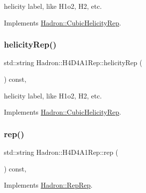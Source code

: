 helicity label, like H1o2, H2, etc. 

Implements \mbox{\hyperlink{structHadron_1_1CubicHelicityRep_af1096946b7470edf0a55451cc662f231}{Hadron\+::\+Cubic\+Helicity\+Rep}}.

\mbox{\label{structHadron_1_1H4D4A1Rep_a8ac76b2d5ec00ea18a04b62a2a5d20bb}} 
\subsubsection{\texorpdfstring{helicityRep()}{helicityRep()}\hspace{0.1cm}{\footnotesize\ttfamily [3/3]}}
{\footnotesize\ttfamily std\+::string Hadron\+::\+H4\+D4\+A1\+Rep\+::helicity\+Rep (\begin{DoxyParamCaption}{ }\end{DoxyParamCaption}) const\hspace{0.3cm}{\ttfamily [inline]}, {\ttfamily [virtual]}}

helicity label, like H1o2, H2, etc. 

Implements \mbox{\hyperlink{structHadron_1_1CubicHelicityRep_af1096946b7470edf0a55451cc662f231}{Hadron\+::\+Cubic\+Helicity\+Rep}}.

\mbox{\label{structHadron_1_1H4D4A1Rep_a5b67fac5b33edc0fa72a93420b2714ca}} 
\subsubsection{\texorpdfstring{rep()}{rep()}\hspace{0.1cm}{\footnotesize\ttfamily [1/5]}}
{\footnotesize\ttfamily std\+::string Hadron\+::\+H4\+D4\+A1\+Rep\+::rep (\begin{DoxyParamCaption}{ }\end{DoxyParamCaption}) const\hspace{0.3cm}{\ttfamily [inline]}, {\ttfamily [virtual]}}



Implements \mbox{\hyperlink{structHadron_1_1RepRep_ab3213025f6de249f7095892109575fde}{Hadron\+::\+Rep\+Rep}}.

\mbox{\label{structHadron_1_1H4D4A1Rep_a5b67fac5b33edc0fa72a93420b2714ca}} 
